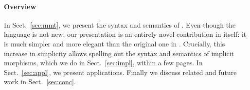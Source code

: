 \paragraph{Overview}
In Sect.~\ref{sec:mmt}, we present the syntax and semantics of \mmt.
Even though the \mmt language is not new, our presentation is an entirely novel contribution in itself: it is much simpler and more elegant than the original one in \cite{RK:mmt:10}.
%
Crucially, this increase in simplicity allows spelling out the syntax and semantics of implicit morphisms, which we do in Sect.~\ref{sec:impl}, within a few pages.
In Sect.~\ref{sec:appl}, we present applications.
Finally we discuss related and future work in Sect.~\ref{sec:conc}.

